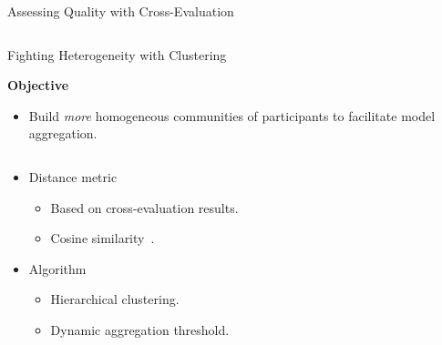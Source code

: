 \begin{frame}{Assessing Quality with Cross-Evaluation}
\begin{columns}
  \end{columns}

\end{frame}



\begin{frame}{Fighting Heterogeneity with Clustering}
  \bigskip\bigskip
  \centering
  \begin{minipage}{.8\textwidth}
    \textbf{Objective}
    \begin{itemize}
      \item Build \emph{more} homogeneous communities of participants to facilitate model aggregation.
    \end{itemize}    
  \end{minipage}

  
  \begin{columns}
    \begin{column}{.5\textwidth}
      \pause
      \begin{itemize}
        \item Distance metric
        \begin{itemize}
            \item Based on \alert{cross-evaluation} results. 
            \item \alert{Cosine similarity}~\autocite{briggs_Federatedlearninghierarchical_2020}.
        \end{itemize}
      \end{itemize}
      
      \pause
      \begin{itemize}
        \item Algorithm
        \begin{itemize}
          \item \alert{Hierarchical clustering}.~\autocite{briggs_Federatedlearninghierarchical_2020}
          \item Dynamic aggregation threshold. 
        \end{itemize}
      \end{itemize}
    \end{column}



\end{columns}
\end{frame}
